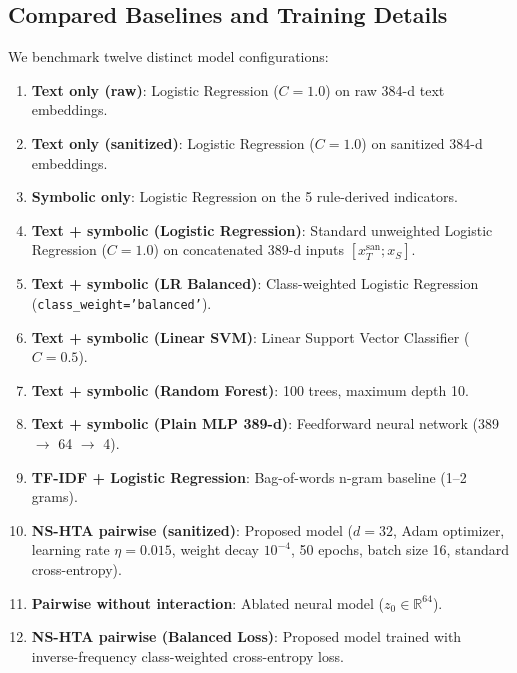 \documentclass[conference]{IEEEtran}
\begin{document}
\subsection{Compared Baselines and Training Details}
We benchmark twelve distinct model configurations:
\begin{enumerate}
    \item \textbf{Text only (raw)}: Logistic Regression ($C=1.0$) on raw 384-d text embeddings.
    \item \textbf{Text only (sanitized)}: Logistic Regression ($C=1.0$) on sanitized 384-d embeddings.
    \item \textbf{Symbolic only}: Logistic Regression on the 5 rule-derived indicators.
    \item \textbf{Text + symbolic (Logistic Regression)}: Standard unweighted Logistic Regression ($C=1.0$) on concatenated 389-d inputs $[x_T^{\text{san}}; x_S]$.
    \item \textbf{Text + symbolic (LR Balanced)}: Class-weighted Logistic Regression (\texttt{class\_weight='balanced'}).
    \item \textbf{Text + symbolic (Linear SVM)}: Linear Support Vector Classifier ($C=0.5$).
    \item \textbf{Text + symbolic (Random Forest)}: 100 trees, maximum depth 10.
    \item \textbf{Text + symbolic (Plain MLP 389-d)}: Feedforward neural network (389 $\rightarrow$ 64 $\rightarrow$ 4).
    \item \textbf{TF-IDF + Logistic Regression}: Bag-of-words n-gram baseline (1--2 grams).
    \item \textbf{NS-HTA pairwise (sanitized)}: Proposed model ($d=32$, Adam optimizer, learning rate $\eta=0.015$, weight decay $10^{-4}$, 50 epochs, batch size 16, standard cross-entropy).
    \item \textbf{Pairwise without interaction}: Ablated neural model ($z_0 \in \mathbb{R}^{64}$).
    \item \textbf{NS-HTA pairwise (Balanced Loss)}: Proposed model trained with inverse-frequency class-weighted cross-entropy loss.
\end{enumerate}
\end{document}
